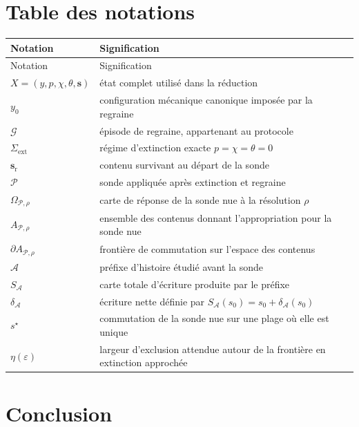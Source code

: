 \section{Table des notations}
\label{annexe-H-notations}

\begin{longtable}{>{\raggedright\arraybackslash}p{}
                  >{\raggedright\arraybackslash}p{}}
\toprule
Notation & Signification \\
\midrule
\endfirsthead
\toprule
Notation & Signification \\
\midrule
\endhead
$X=(y,p,\chi,\theta,\mathbf s)$
& état complet utilisé dans la réduction \\
$y_0$
& configuration mécanique canonique imposée par la regraine \\
$\mathcal G$
& épisode de regraine, appartenant au protocole \\
$\Sigma_{\mathrm{ext}}$
& régime d'extinction exacte $p=\chi=\theta=0$ \\
$\mathbf s_{\mathrm r}$
& contenu survivant au départ de la sonde \\
$\mathcal P$
& sonde appliquée après extinction et regraine \\
$\Omega_{\mathcal P,\rho}$
& carte de réponse de la sonde nue à la résolution $\rho$ \\
$A_{\mathcal P,\rho}$
& ensemble des contenus donnant l'appropriation pour la sonde nue \\
$\partial A_{\mathcal P,\rho}$
& frontière de commutation sur l'espace des contenus \\
$\mathcal A$
& préfixe d'histoire étudié avant la sonde \\
$S_{\mathcal A}$
& carte totale d'écriture produite par le préfixe \\
$\delta_{\mathcal A}$
& écriture nette définie par $S_{\mathcal A}(s_0)=s_0+\delta_{\mathcal A}(s_0)$ \\
$s^{\star}$
& commutation de la sonde nue sur une plage où elle est unique \\
$\eta(\varepsilon)$
& largeur d'exclusion attendue autour de la frontière en extinction approchée \\
\bottomrule
\end{longtable}

\section{Conclusion}
\label{annexe-H-conclusion}

